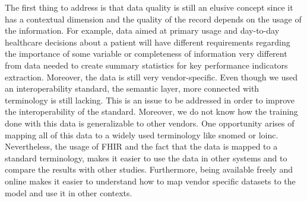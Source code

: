The first thing to address is that data quality is still an elusive concept since it has a contextual dimension and the quality of the record depends on the usage of the information. For example, data aimed at primary usage and day-to-day healthcare decisions about a patient will have different requirements regarding the importance of some variable or completeness of information very different from data needed to create summary statistics for key performance indicators extraction. 
Moreover, the data is still very vendor-specific. Even though we used an interoperability standard, the semantic layer, more connected with terminology is still lacking. This is an issue to be addressed in order to improve the interoperability of the standard. Moreover, we do not know how the training done with this data is generalizable to other vendors. One opportunity arises of mapping all of this data to a widely used terminology like snomed or loinc. Nevertheless, the usage of FHIR and the fact that the data is mapped to a standard terminology, makes it easier to use the data in other systems and to compare the results with other studies. Furthermore, being available freely and online makes it easier to understand how to map vendor specific datasets to the model and use it in other contexts.




